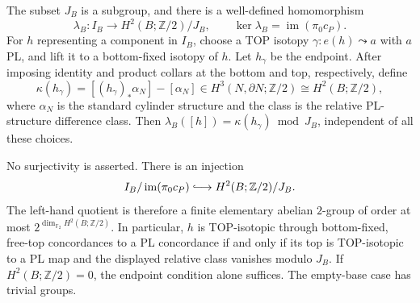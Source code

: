 \begin{theorem}\label{thm:four-dimensional-component-image}
The subset $J_B$ is a subgroup, and there is a well-defined homomorphism
\begin{equation}\label{eq:four-dimensional-component-obstruction}
 \lambda_B:I_B\longrightarrow H^2(B;\mathbb Z/2)/J_B,
 \qquad \ker\lambda_B=\operatorname{im}(\pi_0c_P).
\end{equation}
For $h$ representing a component in $I_B$, choose a TOP isotopy
$\gamma:e(h)\leadsto a$ with $a$ PL, and lift it to a bottom-fixed
isotopy of $h$.  Let $h_\gamma$ be the endpoint.  After imposing
identity and product collars at the bottom and top, respectively,
define
\[
 \kappa(h_\gamma)=[(h_\gamma)_*\alpha_N]-[\alpha_N]
 \in H^3(N,\partial N;\mathbb Z/2)\cong H^2(B;\mathbb Z/2),
\]
where $\alpha_N$ is the standard cylinder structure and the class is
the relative PL-structure difference class.  Then
$\lambda_B([h])=\kappa(h_\gamma)\bmod J_B$, independent of all
these choices.

No surjectivity is asserted.  There is an injection
\begin{equation}\label{eq:four-dimensional-component-quotient}
 I_B/\operatorname{im}(\pi_0c_P)
       \lhook\joinrel\longrightarrow H^2(B;\mathbb Z/2)/J_B.
\end{equation}
The left-hand quotient is therefore a finite elementary abelian
$2$-group of order at most $2^{\dim_{\mathbb F_2}H^2(B;\mathbb Z/2)}$.
In particular, $h$ is TOP-isotopic through bottom-fixed, free-top
concordances to a PL concordance if and only if its top is
TOP-isotopic to a PL map and the displayed relative class vanishes
modulo $J_B$.  If $H^2(B;\mathbb Z/2)=0$, the endpoint condition
alone suffices.  The empty-base case has trivial groups.
\end{theorem}

